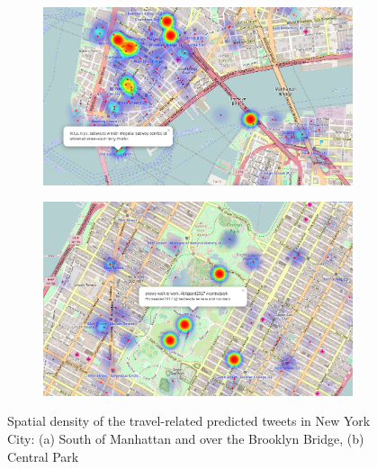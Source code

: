 \begin{figure}[htbp]
	\centering
	\begin{subfigure}[htbp]{0.7\textwidth}
		\centering
		\includegraphics[width=0.9\columnwidth]{figures/nyc_map.png}
		\caption{}
		\label{fig:brooklyn}
	\end{subfigure}
	
	\medskip
	
	\centering
	\begin{subfigure}[htbp]{0.7\textwidth}
		\centering
		\includegraphics[width=0.9\columnwidth]{figures/nyc_map2.png}
		\caption{}
		\label{fig:central_park}
	\end{subfigure}
	
	\caption[Spatial density of the predicted tweets]{Spatial density of the travel-related predicted tweets in New York City: (a) South of Manhattan and over the Brooklyn Bridge, (b) Central Park}
	\label{fig:nyc__geographical_distribution}
\end{figure}

